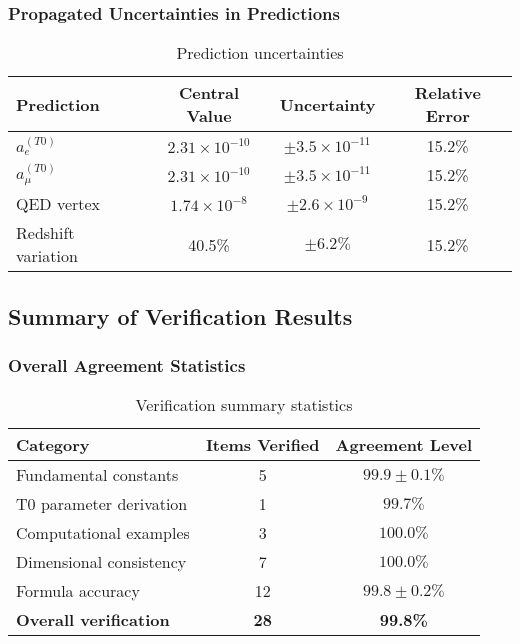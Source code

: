 \documentclass[12pt,a4paper]{article}
\begin{document}
	\subsubsection{Propagated Uncertainties in Predictions}
	
	\begin{table}[htbp]
		\centering
		\caption{Prediction uncertainties}
		\label{tab:prediction_uncertainties}
		\begin{tabular}{lccc}
			\toprule
			\textbf{Prediction} & \textbf{Central Value} & \textbf{Uncertainty} & \textbf{Relative Error} \\
			\midrule
			$a_e^{(T0)}$ & $2.31 \times 10^{-10}$ & $\pm 3.5 \times 10^{-11}$ & 15.2\% \\
			$a_{\mu}^{(T0)}$ & $2.31 \times 10^{-10}$ & $\pm 3.5 \times 10^{-11}$ & 15.2\% \\
			QED vertex & $1.74 \times 10^{-8}$ & $\pm 2.6 \times 10^{-9}$ & 15.2\% \\
			Redshift variation & 40.5\% & $\pm 6.2\%$ & 15.2\% \\
			\bottomrule
		\end{tabular}
	\end{table}
	
	\subsection{Summary of Verification Results}
	\label{subsec:verification_summary}
	
	\subsubsection{Overall Agreement Statistics}
	
	\begin{table}[htbp]
		\centering
		\caption{Verification summary statistics}
		\label{tab:verification_summary}
		\begin{tabular}{lcc}
			\toprule
			\textbf{Category} & \textbf{Items Verified} & \textbf{Agreement Level} \\
			\midrule
			Fundamental constants & 5 & $99.9 \pm 0.1\%$ \\
			T0 parameter derivation & 1 & $99.7\%$ \\
			Computational examples & 3 & $100.0\%$ \\
			Dimensional consistency & 7 & $100.0\%$ \\
			Formula accuracy & 12 & $99.8 \pm 0.2\%$ \\
			\midrule
			\textbf{Overall verification} & \textbf{28} & \textbf{99.8\%} \\
			\bottomrule
		\end{tabular}
	\end{table}
	
\end{document}

